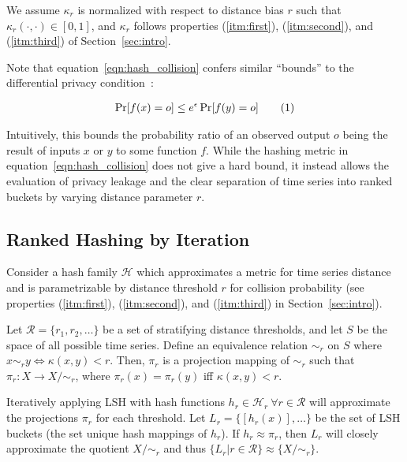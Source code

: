 \documentclass[a4paper]{article}
\newcommand\numberthis{\addtocounter{equation}{1}\tag{\theequation}}
\begin{document}
We assume $\kappa_r$ is normalized with respect to distance bias $r$ such that $\kappa_r(\cdot,\cdot) \in [0,1]$, and $\kappa_r$ follows properties (\ref{itm:first}), (\ref{itm:second}), and (\ref{itm:third}) of Section~\ref{sec:intro}.

Note that equation~\ref{eqn:hash_collision} confers similar ``bounds'' to the differential privacy condition~\cite{dwork2006}:

\begin{align*}
    \Pr[f(x) = o] \le e^{\epsilon} \Pr[f(y) = o] \numberthis
    \label{eqn:differential_privacy}
\end{align*}

Intuitively, this bounds the probability ratio of an observed output $o$ being the result of inputs $x$ or $y$ to some function $f$.
While the hashing metric in equation~\ref{eqn:hash_collision} does not give a hard bound, it instead allows the evaluation of privacy leakage and the clear separation of time series into ranked buckets by varying distance parameter $r$.

\subsection{Ranked Hashing by Iteration}
\label{subsec:ranked_lsh}

Consider a hash family $\mathcal{H}$ which approximates a metric for time series distance and is parametrizable by distance threshold $r$ for collision probability (see properties (\ref{itm:first}), (\ref{itm:second}), and (\ref{itm:third}) in Section~\ref{sec:intro}).

Let $\mathcal{R} = \{r_1, r_2, \ldots\}$ be a set of stratifying distance thresholds, and let $S$ be the space of all possible time series.
Define an equivalence relation $\sim_r$ on $S$ where $x \sim_r y \Leftrightarrow \kappa(x,y) < r$.
Then, $\pi_r$ is a projection mapping of $\sim_r$ such that $\pi_r \colon X \rightarrow X/\sim_r$, where $\pi_r(x) = \pi_r(y)$ iff $\kappa(x,y) < r$.

Iteratively applying LSH with hash functions $h_r \in \mathcal{H}_r~\forall r\in \mathcal{R}$ will approximate the projections $\pi_r$ for each threshold.
Let $L_r = \{[h_r(x)], \ldots \}$ be the set of LSH buckets (the set unique hash mappings of $h_r$).
If $h_r \approx \pi_r$, then $L_r$ will closely approximate the quotient $X/\sim_r$ and thus $\{L_r | r \in \mathcal{R} \} \approx \{X/\sim_r\}$.
\end{document}
